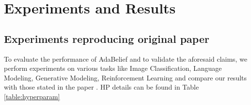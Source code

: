 \section{Experiments and Results}

\label{sec:results}


\subsection{Experiments reproducing original paper}
\label{lab:Results}
To evaluate the performance of AdaBelief and to validate the aforesaid claims, we perform experiments on various tasks like Image Classification, Language Modeling, Generative Modeling, Reinforcement Learning and compare our results with those stated in the paper \cite{zhuang_adabelief_2020}. HP details can be found in Table \ref{table:hyperparam}


